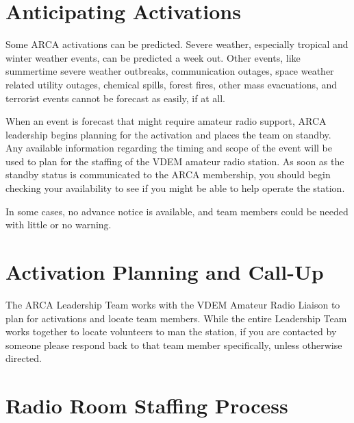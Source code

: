 \documentclass[pdflatex,letterpaper,twoside,12pt]{book}
\begin{document}

\section{Anticipating Activations}

Some ARCA activations can be predicted.  Severe weather, especially tropical and winter weather events, can be predicted a week out.  Other events, like summertime severe weather outbreaks, communication outages, space weather related utility outages, chemical spills, forest fires, other mass evacuations, and terrorist events cannot be forecast as easily, if at all.

When an event is forecast that might require amateur radio support, ARCA leadership begins planning for the activation and places the team on standby.  Any available information regarding the timing and scope of the event will be used to plan for the staffing of the VDEM amateur radio station.  As soon as the standby status is communicated to the ARCA membership, you should begin checking your availability to see if you might be able to help operate the station.

In some cases, no advance notice is available, and team members could be needed with little or no warning.


\section{Activation Planning and Call-Up}

The ARCA Leadership Team works with the VDEM Amateur Radio Liaison to plan for activations and locate team members.  While the entire Leadership Team works together to locate volunteers to man the station, if you are contacted by someone please respond back to that team member specifically, unless otherwise directed.


\section{Radio Room Staffing Process}
\end{document}
